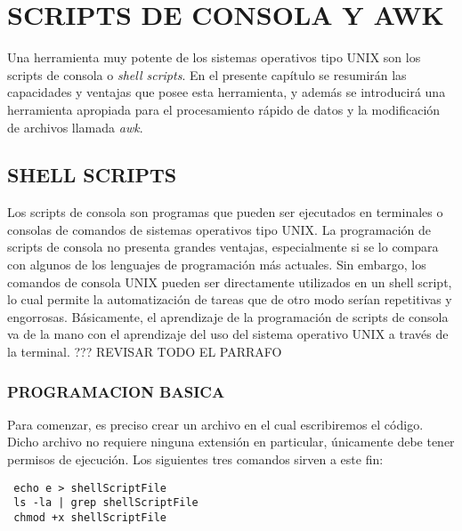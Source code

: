 
\chapter{SCRIPTS DE CONSOLA Y AWK} %

\label{AC} %


Una herramienta muy potente de los sistemas operativos tipo UNIX son los scripts de consola o \textit{shell scripts}. En el presente
capítulo se resumirán las capacidades y ventajas que posee esta herramienta, y además se introducirá una herramienta apropiada para
el procesamiento rápido de datos y la modificación de archivos llamada \textit{awk}.

\section{SHELL SCRIPTS}

Los scripts de consola son programas que pueden ser ejecutados en terminales o consolas de comandos de sistemas operativos tipo UNIX.
La programación de scripts de consola no presenta grandes ventajas, especialmente si se lo compara con algunos de los lenguajes de programación
más actuales. Sin embargo, los comandos de consola UNIX pueden ser directamente utilizados en un shell script, lo cual permite la automatización
de tareas que de otro modo serían repetitivas y engorrosas. Básicamente, el aprendizaje de la programación de scripts de consola va de la mano
con el aprendizaje del uso del sistema operativo UNIX a través de la terminal. ??? REVISAR TODO EL PARRAFO

\subsection{PROGRAMACION BASICA}

Para comenzar, es preciso crear un archivo en el cual escribiremos el código. Dicho archivo no requiere ninguna extensión en particular,
únicamente debe tener permisos de ejecución. Los siguientes tres comandos sirven a este fin:
\begin{lstlisting}
 echo e > shellScriptFile
 ls -la | grep shellScriptFile
 chmod +x shellScriptFile
\end{lstlisting}

